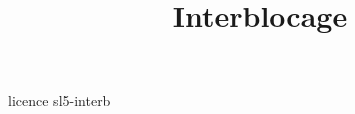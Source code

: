 \documentclass [xcolor=table] {beamer}
\title {Interblocage}
\begin{document}
 {licence}
 {sl5-interb}
\end{document}
